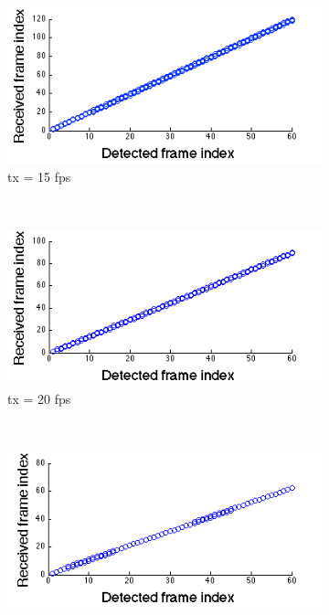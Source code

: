 \begin{figure}[!htb]
   \centering
   \begin{subfigure}[h]{0.25\textwidth}
      \includegraphics[width=\textwidth]{fig/tx_15.png}
      \caption{tx = 15 fps} \label{fig:tx_15fps}
   \end{subfigure}%
   ~
   \begin{subfigure}[h]{0.25\textwidth}
      \includegraphics[width=\textwidth]{fig/tx_20.png}
      \caption{tx = 20 fps} \label{fig:tx_20fps}
   \end{subfigure}%
   \\   
   \begin{subfigure}[h]{0.25\textwidth}
      \includegraphics[width=\textwidth]{fig/tx_29.png}

\end{subfigure}
\end{figure}
